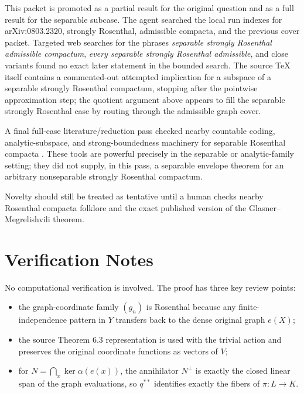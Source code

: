 \documentclass[11pt]{article}
\begin{document}
This packet is promoted as a partial result for the original question and as a
full result for the separable subcase.  The agent searched the local run
indexes for arXiv:0803.2320, strongly Rosenthal, admissible compacta, and the
previous cover packet.  Targeted web searches for the phrases
\emph{separable strongly Rosenthal admissible compactum},
\emph{every separable strongly Rosenthal admissible}, and close variants found
no exact later statement in the bounded search.  The source TeX itself
contains a commented-out attempted implication for a subspace of a separable
strongly Rosenthal compactum, stopping after the pointwise approximation step;
the quotient argument above appears to fill the separable strongly Rosenthal
case by routing through the admissible graph cover.

A final full-case literature/reduction pass checked nearby countable coding,
analytic-subspace, and strong-boundedness machinery for separable Rosenthal
compacta \cite{DodosCoding,ADK,DodosStrong}.  These tools are powerful
precisely in the separable or analytic-family setting; they did not supply, in
this pass, a separable envelope theorem for an arbitrary nonseparable strongly
Rosenthal compactum.

Novelty should still be treated as tentative until a human checks nearby
Rosenthal compacta folklore and the exact published version of the
Glasner--Megrelishvili theorem.

\section*{Verification Notes}

No computational verification is involved.  The proof has three key review
points:

\begin{itemize}
  \item the graph-coordinate family \((g_n)\) is Rosenthal because any
  finite-independence pattern in \(Y\) transfers back to the dense original
  graph \(e(X)\);
  \item the source Theorem 6.3 representation is used with the trivial action
  and preserves the original coordinate functions as vectors of \(V\);
  \item for
  \(N=\bigcap_x\ker\alpha(e(x))\), the annihilator
  \(N^\perp\) is exactly the closed linear span of the graph evaluations,
  so \(q^{**}\) identifies exactly the fibers of \(\pi:L\to K\).
\end{itemize}
\end{document}
